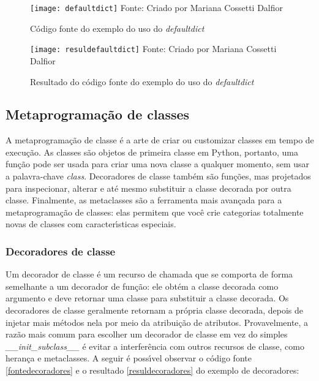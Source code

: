 \begin{figure}[H]
	\begin{center}
		\caption{C\'{o}digo fonte do exemplo do uso do \textsl{defaultdict}} \label{fontedefaultdict}
		\texttt{[image: defaultdict]} 
		\newline
		Fonte: Criado por Mariana Cossetti Dalfior
	\end{center}
\end{figure}

\begin{figure}[H]
	\begin{center}
		\caption{Resultado do c\'{o}digo fonte do exemplo do uso do \textsl{defaultdict}} \label{resuldefaultdict}
		\texttt{[image: resuldefaultdict]} 
		\newline
		Fonte: Criado por Mariana Cossetti Dalfior
	\end{center}
\end{figure}

	\subsection{Metaprograma\c{c}\~{a}o de classes}
A metaprograma\c{c}\~{a}o de classe \'{e} a arte de criar ou customizar classes em tempo de execu\c{c}\~{a}o. As classes s\~{a}o objetos de primeira classe em Python, portanto, uma fun\c{c}\~{a}o pode ser usada para criar uma nova classe a qualquer momento, sem usar a palavra-chave \textsl{class}. Decoradores de classe tamb\'{e}m s\~{a}o fun\c{c}\~{o}es, mas projetados para inspecionar, alterar e at\'{e} mesmo substituir a classe decorada por outra classe. Finalmente, as metaclasses s\~{a}o a ferramenta mais avan\c{c}ada para a metaprograma\c{c}\~{a}o de classes: elas permitem que voc\^{e} crie categorias totalmente novas de classes com caracter\'{\i}sticas especiais.

		\subsubsection{Decoradores de classe}

Um decorador de classe \'{e} um recurso de chamada que se comporta de forma semelhante a um decorador de fun\c{c}\~{a}o: ele obt\'{e}m a classe decorada como argumento e deve retornar uma classe para substituir a classe decorada. Os decoradores de classe geralmente retornam a pr\'{o}pria classe decorada, depois de injetar mais m\'{e}todos nela por meio da atribui\c{c}\~{a}o de atributos. Provavelmente, a raz\~{a}o mais comum para escolher um decorador de classe em vez do simples \textsl{\_\_init\_subclass\_\_} \'{e} evitar a interfer\^{e}ncia com outros recursos de classe, como heran\c{c}a e metaclasses. A seguir \'{e} poss\'{\i}vel observar o c\'{o}digo fonte \ref{fontedecoradores} e o resultado \ref{resuldecoradores} do exemplo de decoradores:

